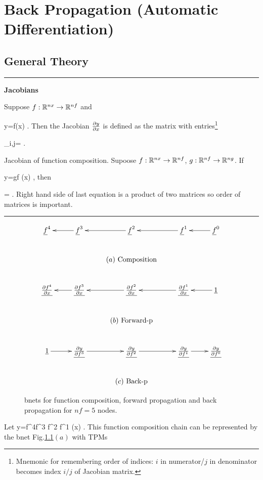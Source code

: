 \chapter{Back Propagation
 (Automatic Differentiation)}

\section*{General Theory}

\hrule\noindent
{\bf Jacobians}

Suppose
 $f:{ \mathbb{R}}^{nx}\rightarrow { \mathbb{R}}^{nf}$
and 

\beq
y=f(x)
\;.
\eeq
Then the Jacobian $\frac{\partial y}{\partial x}$
is defined as the matrix with entries\footnote{
Mnemonic for remembering 
order of indices: $i$ in numerator/$j$ in denominator
becomes index $i/j$ of Jacobian matrix.}

\beq
{}_{i,j}=
\;.
\eeq




Jacobian of function composition.
Supoose $f:{ \mathbb{R}}^{nx}\rightarrow{ \mathbb{R}}^{nf}$,
$g:{ \mathbb{R}}^{nf}\rightarrow { \mathbb{R}}^{ng}$. If

\beq
y=g\circ f (x)
\;,
\eeq
then

\beq
{}
=
\;.
\eeq
Right hand side
of last equation 
is a product
of two matrices
so order of matrices is important.

\hrule



\begin{figure}[h!]
\centering
$$
\xymatrix{
\rvf^4
&
\rvf^3\ar[l]
&
\rvf^2\ar[l]
&
\rvf^1\ar[l]
&
\rvf^0\ar[l]
\\
&&\text{$(a)$ Composition}
\\
\ul{\pder{f^4}{x}}
&
\ul{\pder{f^3}{x}}\ar[l]
&
\ul{\pder{f^2}{x}}\ar[l]
&
\ul{\pder{f^1}{x}}\ar[l]
&
\ul{1}\ar[l]
\\
&&\text{$(b)$ Forward-p}
\\
\ul{1}\ar[r]
&
\ul{\pder{y}{f^3}}\ar[r]
&
\ul{\pder{y}{f^2}}\ar[r]
&
\ul{\pder{y}{f^1}}\ar[r]
&
\ul{\pder{y}{f^0}}
\\
&&\text{$(c)$ Back-p}
}
$$
\caption{bnets for function
composition,
forward propagation and back propagation
for $nf=5$ nodes.}
\label{fig-backp-abc}
\end{figure}


Let
\beq
y=f^4\circ f^3 \circ f^2 \circ f^1 (x)
\;.
\eeq
This function composition chain can be
represented by the bnet
Fig.\ref{fig-backp-abc}$(a)$
with TPMs

